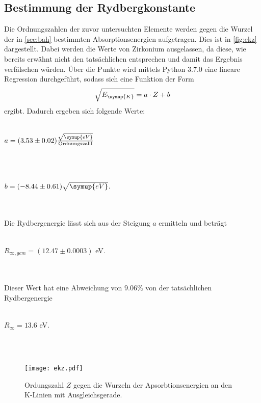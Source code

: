     \subsection{Bestimmung der Rydbergkonstante}  
        Die Ordnungszahlen der zuvor untersuchten Elemente werden gegen die Wurzel der in \autoref{sec:bah} bestimmten Absorptionsenergien
        aufgetragen. Dies ist in \autoref{fig:ekz} dargestellt. Dabei werden die Werte von Zirkonium ausgelassen, da diese, wie bereits 
        erwähnt nicht den tatsächlichen entsprechen und damit das Ergebnis verfälschen würden.
        Über die Punkte wird mittels Python 3.7.0 eine lineare Regression durchgeführt, sodass sich eine Funktion der Form
        \begin{equation}
        \label{eqn:regress}
            \sqrt{E_{\symup{K}}} = a \cdot Z + b
        \end{equation}
        ergibt. Dadurch ergeben sich folgende Werte:
        \\ \\
        \centerline{$a = (3.53 \pm 0.02) \frac{\sqrt{\symup{eV}}}{\text{Ordnungszahl}} $}
        \\ \\
        \centerline{$b = (-8.44 \pm 0.61) \sqrt{\symup{eV}}$.}
        \\ \\
        Die Rydbergenergie lässt sich aus der Steigung $a$ ermitteln und beträgt
        \\ \\
        \centerline{$R_{\infty, gem} = (12.47 \pm 0.0003)$ eV.}
        \\ \\
        Dieser Wert hat eine Abweichung von $9.06 \%$ von der tatsächlichen Rydbergenergie
        \\ \\
        \centerline{$R_{\infty} = 13.6$ eV.}
        \\ \\
        \begin{figure}
            \centering
            \texttt{[image: ekz.pdf]}
            \caption{Ordungszahl $Z$ gegen die Wurzeln der Apsorbtionsenergien an den K-Linien mit Ausgleichsgerade.}
            \label{fig:ekz}
        \end{figure}

